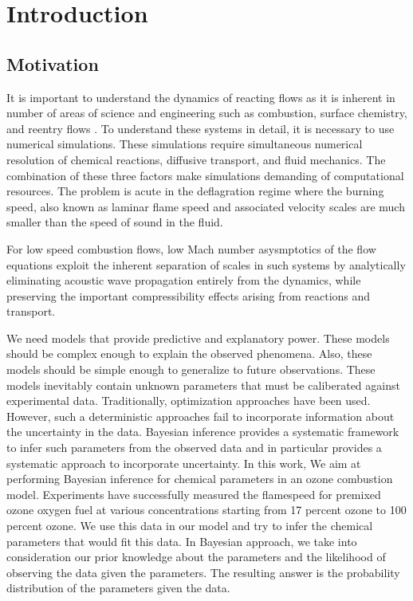 \chapter{Introduction}

\section{Motivation}
It is important to understand the dynamics of reacting flows as it is inherent in number of areas of science and engineering such as combustion, surface chemistry, and reentry flows . To understand these systems in detail, it is necessary to use numerical simulations. These simulations require simultaneous numerical resolution of chemical reactions, diffusive transport, and fluid mechanics. The combination of these three factors make simulations demanding of computational resources. The problem is acute in the deflagration regime where the burning speed, also known as laminar flame speed and associated velocity scales are much smaller than the speed of sound in the fluid.

\bigskip
\noindent For low speed combustion flows, low Mach number asysmptotics of the flow equations exploit the inherent separation of scales in such systems by analytically eliminating acoustic wave propagation entirely from the dynamics, while preserving the important compressibility effects arising from reactions and transport.

\bigskip
\noindent  We need models that provide predictive and explanatory power. These models should be complex enough to explain the observed phenomena. Also, these models should be simple enough to generalize to future observations. These models inevitably contain unknown parameters that must be caliberated against experimental data. Traditionally, optimization approaches have been used. However, such a deterministic approaches fail to incorporate information about the uncertainty in the data. Bayesian inference provides a systematic framework to infer such parameters from the observed data and in particular provides a systematic approach to incorporate uncertainty. 
In this work, We aim at performing Bayesian inference for chemical parameters in an ozone combustion model. Experiments\cite{Streng} have successfully measured the flamespeed for premixed ozone oxygen   fuel at various concentrations starting from  17 percent ozone to 100 percent ozone. We use this data in our model and try to infer the chemical parameters that would fit this data. In Bayesian approach, we take into consideration our prior knowledge about the parameters and the likelihood of observing the data given the parameters. The resulting answer is the probability distribution of the parameters given the data.  



